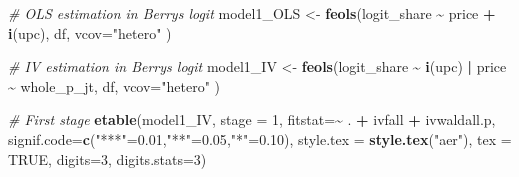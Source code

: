 \documentclass[
]{article}
\newenvironment{Shaded}{\begin{snugshade}}{\end{snugshade}}
\newcommand{\AttributeTok}[1]{\textcolor[rgb]{0.13,0.29,0.53}{#1}}
\newcommand{\CommentTok}[1]{\textcolor[rgb]{0.56,0.35,0.01}{\textit{#1}}}
\newcommand{\ConstantTok}[1]{\textcolor[rgb]{0.56,0.35,0.01}{#1}}
\newcommand{\DecValTok}[1]{\textcolor[rgb]{0.00,0.00,0.81}{#1}}
\newcommand{\FloatTok}[1]{\textcolor[rgb]{0.00,0.00,0.81}{#1}}
\newcommand{\FunctionTok}[1]{\textcolor[rgb]{0.13,0.29,0.53}{\textbf{#1}}}
\newcommand{\NormalTok}[1]{#1}
\newcommand{\OtherTok}[1]{\textcolor[rgb]{0.56,0.35,0.01}{#1}}
\newcommand{\SpecialCharTok}[1]{\textcolor[rgb]{0.81,0.36,0.00}{\textbf{#1}}}
\newcommand{\StringTok}[1]{\textcolor[rgb]{0.31,0.60,0.02}{#1}}
\begin{document}
\begin{Shaded}
\begin{Highlighting}[]
\CommentTok{\# OLS estimation in Berry\textquotesingle{}s logit}
\NormalTok{model1\_OLS }\OtherTok{\textless{}{-}} \FunctionTok{feols}\NormalTok{(logit\_share }\SpecialCharTok{\textasciitilde{}}\NormalTok{  price }\SpecialCharTok{+} \FunctionTok{i}\NormalTok{(upc), }
\NormalTok{               df, }\AttributeTok{vcov=}\StringTok{"hetero"}
\NormalTok{)}

\CommentTok{\# IV estimation in Berry\textquotesingle{}s logit}
\NormalTok{model1\_IV }\OtherTok{\textless{}{-}} \FunctionTok{feols}\NormalTok{(logit\_share }\SpecialCharTok{\textasciitilde{}}  \FunctionTok{i}\NormalTok{(upc) }\SpecialCharTok{|}\NormalTok{ price }\SpecialCharTok{\textasciitilde{}}\NormalTok{ whole\_p\_jt, }
\NormalTok{               df, }\AttributeTok{vcov=}\StringTok{"hetero"}
\NormalTok{)}

\CommentTok{\# First stage}
\FunctionTok{etable}\NormalTok{(model1\_IV, }\AttributeTok{stage =} \DecValTok{1}\NormalTok{, }\AttributeTok{fitstat=}\SpecialCharTok{\textasciitilde{}}\NormalTok{ . }\SpecialCharTok{+}\NormalTok{ ivfall }\SpecialCharTok{+}\NormalTok{ ivwaldall.p,}
       \AttributeTok{signif.code=}\FunctionTok{c}\NormalTok{(}\StringTok{"***"}\OtherTok{=}\FloatTok{0.01}\NormalTok{,}\StringTok{"**"}\OtherTok{=}\FloatTok{0.05}\NormalTok{,}\StringTok{"*"}\OtherTok{=}\FloatTok{0.10}\NormalTok{), }
       \AttributeTok{style.tex =} \FunctionTok{style.tex}\NormalTok{(}\StringTok{"aer"}\NormalTok{),  }\AttributeTok{tex =} \ConstantTok{TRUE}\NormalTok{,}
       \AttributeTok{digits=}\DecValTok{3}\NormalTok{, }\AttributeTok{digits.stats=}\DecValTok{3}\NormalTok{)}
\end{Highlighting}
\end{Shaded}
\end{document}

